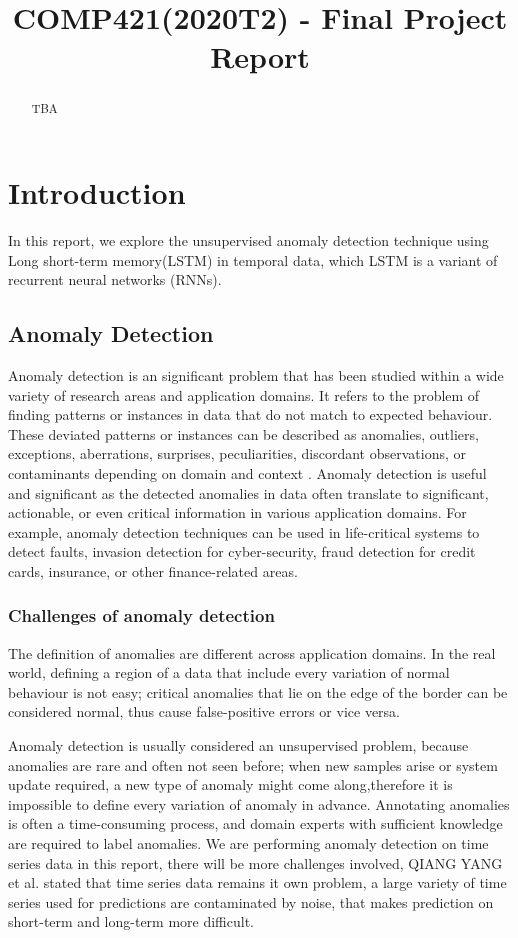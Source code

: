 \documentclass{article}
\title{COMP421(2020T2) - Final Project Report}
\begin{document}
\maketitle

\begin{abstract}
TBA
\end{abstract}


\section{Introduction}
\label{sec:intro}

In this report, we explore the unsupervised anomaly detection technique using
Long short-term memory(LSTM) in temporal data, which LSTM is a variant of
recurrent neural networks (RNNs).

\subsection{Anomaly Detection}
Anomaly detection is an significant problem that has been studied within
a wide variety of research areas and application domains. It refers to the
problem of finding patterns or instances in data that do not match to expected
behaviour. These deviated patterns or instances can be described as
anomalies, outliers, exceptions, aberrations, surprises, peculiarities,
discordant observations, or contaminants depending on domain and context
\cite{1-Anomalydetection}. Anomaly detection is useful and significant as
the detected anomalies in data often translate to significant, actionable,
or even critical information in various application domains. For example,
anomaly detection
techniques can be used in life-critical systems to detect faults, invasion
detection for
cyber-security, fraud detection for credit cards, insurance, or other
finance-related areas. 

\subsubsection{Challenges of anomaly detection}
The definition of anomalies are different across application domains. In the
real world, defining a region of a data that include every variation of normal
behaviour is not easy; critical anomalies that lie on the edge of the border
can be considered normal, thus cause false-positive errors or vice versa. 

Anomaly detection is usually considered an unsupervised problem,
because anomalies are rare and often not seen before; when new
samples arise or system update required, a new type of anomaly might come
along,therefore it is impossible to define every variation of anomaly in
advance.
Annotating anomalies is often a time-consuming process, and domain experts
with sufficient knowledge are required to label anomalies. We are performing
anomaly detection on time series data in this report,
there will be more challenges involved, QIANG YANG
et al. \cite{2-10challengingproblems} stated that time series data remains it
own problem,  a large variety of time series used for predictions are
contaminated by noise, that makes prediction on short-term and
long-term more difficult.
\end{document}
